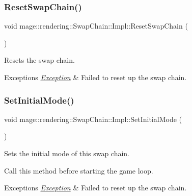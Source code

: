 \subsubsection{\texorpdfstring{Reset\+Swap\+Chain()}{ResetSwapChain()}}
{\footnotesize\ttfamily void mage\+::rendering\+::\+Swap\+Chain\+::\+Impl\+::\+Reset\+Swap\+Chain (\begin{DoxyParamCaption}{ }\end{DoxyParamCaption})\hspace{0.3cm}{\ttfamily [private]}}

Resets the swap chain.


\begin{DoxyExceptions}{Exceptions}
{\em \hyperlink{classmage_1_1_exception}{Exception}} & Failed to reset up the swap chain. \\
\hline
\end{DoxyExceptions}
\hypertarget{classmage_1_1rendering_1_1_swap_chain_1_1_impl_a910fab71dd7977005e11179080b25f14}{}\label{classmage_1_1rendering_1_1_swap_chain_1_1_impl_a910fab71dd7977005e11179080b25f14} 
\subsubsection{\texorpdfstring{Set\+Initial\+Mode()}{SetInitialMode()}}
{\footnotesize\ttfamily void mage\+::rendering\+::\+Swap\+Chain\+::\+Impl\+::\+Set\+Initial\+Mode (\begin{DoxyParamCaption}{ }\end{DoxyParamCaption})}

Sets the initial mode of this swap chain.

Call this method before starting the game loop.


\begin{DoxyExceptions}{Exceptions}
{\em \hyperlink{classmage_1_1_exception}{Exception}} & Failed to reset up the swap chain. \\
\hline
\end{DoxyExceptions}
\hypertarget{classmage_1_1rendering_1_1_swap_chain_1_1_impl_a6f97179cc5e352a349ed943413d149e7}{}\label{classmage_1_1rendering_1_1_swap_chain_1_1_impl_a6f97179cc5e352a349ed943413d149e7} 
